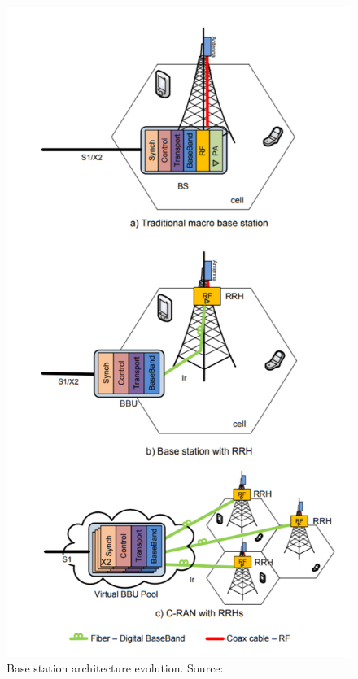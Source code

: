 \documentclass[notitlepage,hidelinks]{article}
\begin{document}
\begin{figure}
  \includegraphics[scale=0.5]{res/compare_arc_CRAN.PNG}
    \caption{Base station architecture evolution.
    Source: \parencite{checko14}}
  \label{fig:compare_arc_CRAN}
\end{figure}
\end{document}
